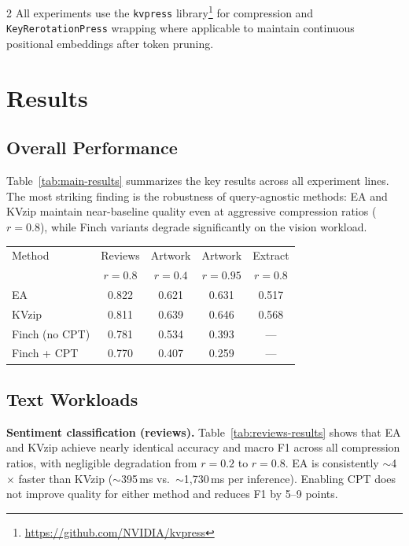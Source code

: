 \documentclass[10pt,a4paper]{article}
\begin{document}
\begin{multicols}{2}
All experiments use the \texttt{kvpress}
library\footnote{\url{https://github.com/NVIDIA/kvpress}} for
compression and \texttt{KeyRerotationPress} wrapping where applicable to
maintain continuous positional embeddings after token pruning.

\section{Results}

\subsection{Overall Performance}

Table~\ref{tab:main-results} summarizes the key results across all
experiment lines. The most striking finding is the robustness of
query-agnostic methods: EA and KVzip maintain near-baseline quality even
at aggressive compression ratios ($r=0.8$), while Finch variants degrade
significantly on the vision workload.

\begin{center}
  \centering
  \label{tab:main-results}
  \begin{tabular}{lcccc}
    \toprule
    Method & Reviews & Artwork & Artwork & Extract \\
           & $r{=}0.8$ & $r{=}0.4$ & $r{=}0.95$ & $r{=}0.8$ \\
    \midrule
    EA              & 0.822 & 0.621 & 0.631 & 0.517 \\
    KVzip           & 0.811 & 0.639 & 0.646 & 0.568 \\
    Finch (no CPT)  & 0.781 & 0.534 & 0.393 & --- \\
    Finch + CPT     & 0.770 & 0.407 & 0.259 & --- \\
    \bottomrule
  \end{tabular}
\end{center}

\subsection{Text Workloads}

\textbf{Sentiment classification (reviews).}
Table~\ref{tab:reviews-results} shows that EA and KVzip achieve nearly
identical accuracy and macro F1 across all compression ratios, with
negligible degradation from $r=0.2$ to $r=0.8$. EA is consistently
$\sim$4$\times$ faster than KVzip ($\sim$395\,ms vs.\
$\sim$1{,}730\,ms per inference). Enabling CPT does not improve quality
for either method and reduces F1 by 5--9 points.


\end{multicols}
\end{document}
